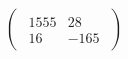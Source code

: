 \documentclass{book}
\begin{document}
\begin{gather*}
\begin{pmatrix}
\begin{array}{rl}
1555 & 28 \\16 & -165
\end{array}
\end{pmatrix}
\end{gather*}
\end{document}
